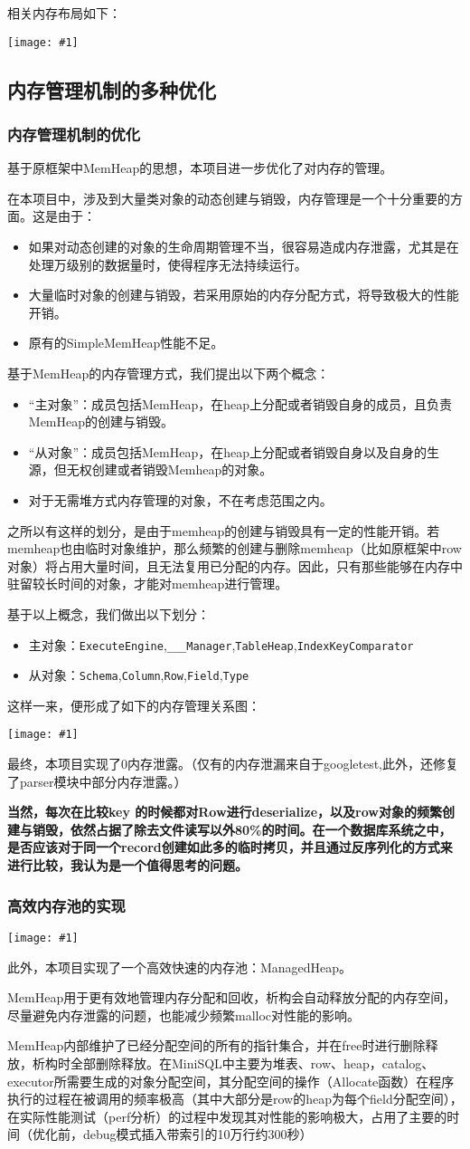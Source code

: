 \documentclass[12pt, a4paper]{article}
\def\c#1{\texttt{#1}}
\def\b#1{\textbf{#1}}
\def\ss#1{\subsection{#1}}
\def\sss#1{\subsubsection{#1}}
\def\p{\par}
\def\g#1{\begin{center}\texttt{[image: \#1]}\end{center}}
\begin{document}
相关内存布局如下：
\g {b_plus_tree_pages.pdf}
\ss{内存管理机制的多种优化}
\sss{内存管理机制的优化}
\p 基于原框架中MemHeap的思想，本项目进一步优化了对内存的管理。
\p 在本项目中，涉及到大量类对象的动态创建与销毁，内存管理是一个十分重要的方面。这是由于：
\begin{itemize}
  \item 如果对动态创建的对象的生命周期管理不当，很容易造成内存泄露，尤其是在处理万级别的数据量时，使得程序无法持续运行。
  \item 大量临时对象的创建与销毁，若采用原始的内存分配方式，将导致极大的性能开销。
  \item 原有的SimpleMemHeap性能不足。
\end{itemize}
\p 基于MemHeap的内存管理方式，我们提出以下两个概念：
\begin{itemize}
  \item “主对象”：成员包括MemHeap，在heap上分配或者销毁自身的成员，且负责MemHeap的创建与销毁。
  \item “从对象”：成员包括MemHeap，在heap上分配或者销毁自身以及自身的生源，但无权创建或者销毁Memheap的对象。
  \item 对于无需堆方式内存管理的对象，不在考虑范围之内。
\end{itemize}
\p 之所以有这样的划分，是由于memheap的创建与销毁具有一定的性能开销。若memheap也由临时对象维护，那么频繁的创建与删除memheap（比如原框架中row对象）将占用大量时间，且无法复用已分配的内存。因此，只有那些能够在内存中驻留较长时间的对象，才能对memheap进行管理。
\p 基于以上概念，我们做出以下划分：
\begin{itemize}
  \item 主对象：\c{ExecuteEngine},\c{\_\_\_Manager},\c{TableHeap},\c{IndexKeyComparator}
  \item 从对象：\c{Schema},\c{Column},\c{Row},\c{Field},\c{Type}
\end{itemize}
\p 这样一来，便形成了如下的内存管理关系图：
\g{mem_relation.pdf}
\p 最终，本项目实现了0内存泄露。（仅有的内存泄漏来自于googletest,此外，还修复了parser模块中部分内存泄露。）
\p \b{当然，每次在比较key 的时候都对Row进行deserialize，以及row对象的频繁创建与销毁，依然占据了除去文件读写以外80\%的时间。在一个数据库系统之中，是否应该对于同一个record创建如此多的临时拷贝，并且通过反序列化的方式来进行比较，我认为是一个值得思考的问题。}
\sss{高效内存池的实现}
\g{imgs/mem_heap.png}
\p 此外，本项目实现了一个高效快速的内存池：ManagedHeap。
\p MemHeap用于更有效地管理内存分配和回收，析构会自动释放分配的内存空间，尽量避免内存泄露的问题，也能减少频繁malloc对性能的影响。
\p MemHeap内部维护了已经分配空间的所有的指针集合，并在free时进行删除释放，析构时全部删除释放。在MiniSQL中主要为堆表、row、heap，catalog、 executor所需要生成的对象分配空间，其分配空间的操作（Allocate函数）在程序执行的过程在被调用的频率极高（其中大部分是row的heap为每个field分配空间），在实际性能测试（perf分析）的过程中发现其对性能的影响极大，占用了主要的时间（优化前，debug模式插入带索引的10万行约300秒）
\end{document}
